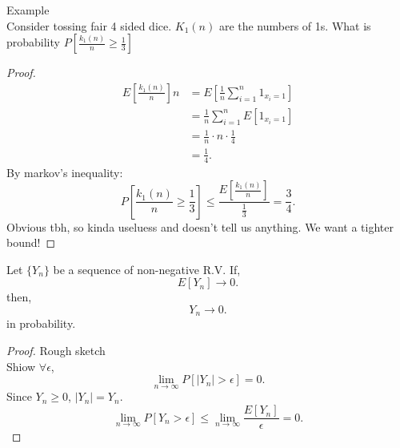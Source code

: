 \documentclass[a4paper]{article}
\begin{document}
\begin{note}{Example}\\
  Consider tossing fair 4 sided dice. $K_1(n)$ are the numbers of 1s. What is probability  $P[\frac{k_1(n)}{n} \geq \frac{1}{3}]$ 

  \begin{proof}
    \begin{align*}
      E[\frac{k_1(n)}{n}] n&= E[\frac{1}{n} \sum_{i=1}^{n} 1_{x_i =1}] \\
                          &= \frac{1}{n} \sum_{i=1}^{n}E[1_{x_i =1}] \\
                          &= \frac{1}{n} \cdot n \cdot \frac{1}{4} \\
                          &= \frac{1}{4}
    .\end{align*}
    By markov's inequality:
    \[
      P[\frac{k_1(n)}{n} \geq \frac{1}{3}] \leq \frac{E[\frac{k_1(n)}{n}]}{\frac{1}{3}} = \frac{3}{4} 
    .\] 
    Obvious tbh, so kinda useluess and doesn't tell us anything. We want a tighter bound!
  \end{proof}
\end{note}

\begin{prop}
  Let $\{Y_n\} $ be a sequence of non-negative R.V. If,
   \[
     E[Y_n] \to 0
  .\] 
  then, 
  \[
  Y_n \to 0
  .\] 
  in probability. 
  \begin{proof}{Rough sketch}\\
    Shiow $\forall \epsilon$,
     \[
       \lim_{n \to \infty} P[|Y_n| > \epsilon] = 0
    .\] 
    Since $Y_n \geq 0$,  $|Y_n| = Y_n$.
     \[
       \lim_{n \to \infty} P[Y_n > \epsilon] \leq \lim_{n \to \infty} \frac{E[Y_n]}{\epsilon} = 0
    .\] 
  \end{proof}
\end{prop}
\end{document}
